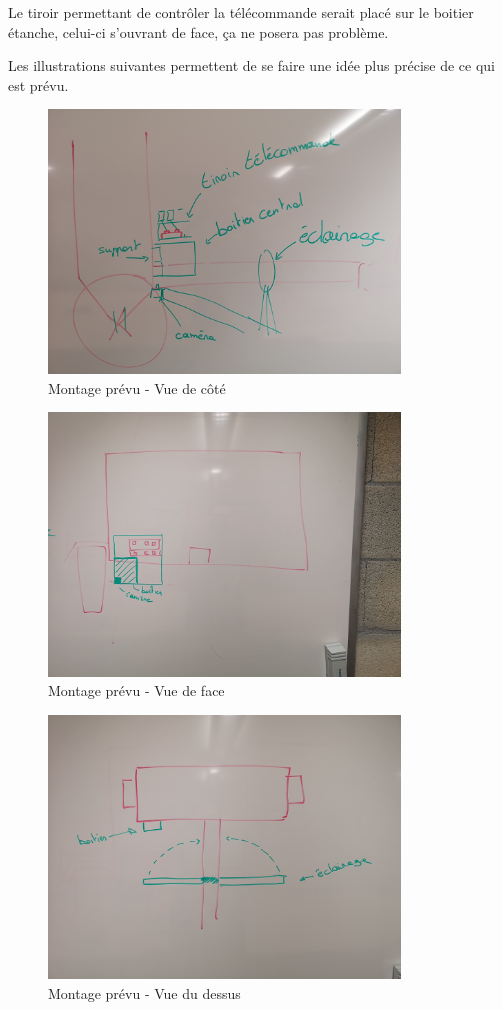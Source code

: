 Le tiroir permettant de contrôler la télécommande serait placé sur le boitier étanche, celui-ci s'ouvrant de face, ça ne posera pas problème.

Les illustrations suivantes permettent de se faire une idée plus précise de ce qui est prévu.

\begin{figure}[H]
    \centering
    \includegraphics[height=7cm]{assets/figures/montage1.jpg}
    \caption{Montage prévu - Vue de côté}
\end{figure}

\begin{figure}[H]
    \centering
    \includegraphics[height=7cm]{assets/figures/montage2.jpg}
    \caption{Montage prévu - Vue de face}
\end{figure}

\begin{figure}[H]
    \centering
    \includegraphics[height=7cm]{assets/figures/montage3.jpg}
    \caption{Montage prévu - Vue du dessus}
\end{figure}


